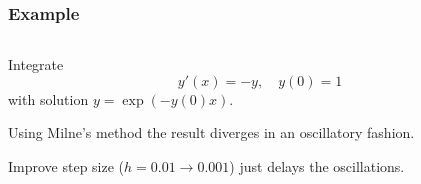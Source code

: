 \documentclass{beamer}
\begin{document}
\begin{frame}
  \frametitle{Example}


  \begin{columns}
    \begin{column}{0.5\textwidth}
      Integrate
      \begin{equation*}
        y'(x) = -y, \quad y(0) = 1
      \end{equation*}
      with solution $y = \exp(- y(0) x)$. \pause

      \vspace{1ex}

      Using Milne's method the result diverges in an oscillatory
      fashion. \pause

      \vspace{1ex}

      Improve step size ($h = 0.01 \rightarrow 0.001$) just delays the
      oscillations. \pause

      \vspace{1ex}


\end{column}
\end{columns}
\end{frame}
\end{document}
